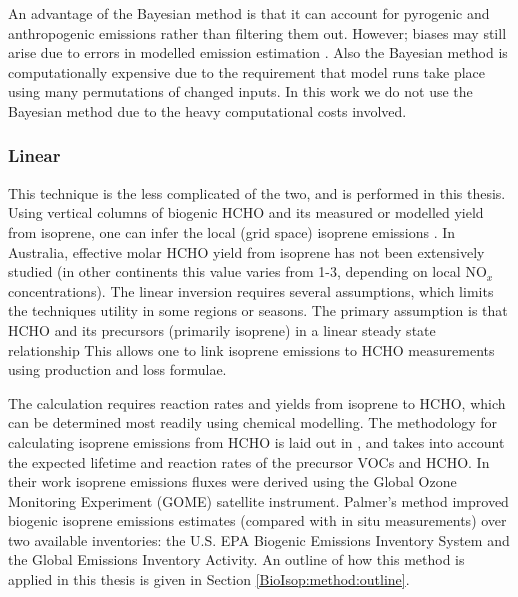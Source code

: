       
      An advantage of the Bayesian method is that it can account for pyrogenic and anthropogenic emissions rather than filtering them out.
      However; biases may still arise due to errors in modelled emission estimation \parencite{Curci2010}.
      Also the Bayesian method is computationally expensive due to the requirement that model runs take place using many permutations of changed inputs.
      In this work we do not use the Bayesian method due to the heavy computational costs involved.
      
        
    \subsubsection{Linear}
      \label{BioIsop:intro:top_down_linear}
      
      This technique is the less complicated of the two, and is performed in this thesis.
      Using vertical columns of biogenic HCHO and its measured or modelled yield from isoprene, one can infer the local (grid space) isoprene emissions \parencite{Palmer2003, Millet2006,Marais2012,Bauwens2016}.
      In Australia, effective molar HCHO yield from isoprene has not been extensively studied (in other continents this value varies from 1-3, depending on local NO$_x$ concentrations).
      The linear inversion requires several assumptions, which limits the techniques utility in some regions or seasons.
      The primary assumption is that HCHO and its precursors (primarily isoprene) in a linear steady state relationship
      This allows one to link isoprene emissions to HCHO measurements using production and loss formulae.
      
      The calculation requires reaction rates and yields from isoprene to HCHO, which can be determined most readily using chemical modelling.
      The methodology for calculating isoprene emissions from HCHO is laid out in \textcite{Palmer2003}, and takes into account the expected lifetime and reaction rates of the precursor VOCs and HCHO.
      In their work isoprene emissions fluxes were derived using the Global Ozone Monitoring Experiment (GOME) satellite instrument.
      Palmer's method improved biogenic isoprene emissions estimates (compared with in situ measurements) over two available inventories: the U.S. EPA Biogenic Emissions Inventory System and the Global Emissions Inventory Activity. %
      An outline of how this method is applied in this thesis is given in Section \ref{BioIsop:method:outline}.
      
